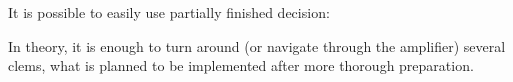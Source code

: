 
It is possible to easily use partially finished decision:
\begin{center}
\end{center}
In theory, it is enough to turn around (or navigate through the amplifier) several clems, 
what is planned to be implemented after more thorough preparation.